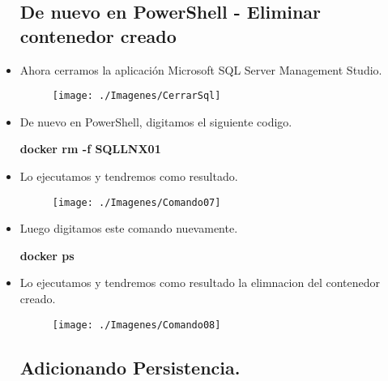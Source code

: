 \begin{itemize}
			\subsection{De nuevo en PowerShell - Eliminar contenedor creado}
				\item Ahora cerramos la aplicación Microsoft SQL Server Management Studio.
					\begin{figure}[htb]
						\begin{center}
							\texttt{[image: ./Imagenes/CerrarSql]}
						\end{center}
					\end{figure}
				\item De nuevo en PowerShell, digitamos el siguiente codigo.
					\begin{center}
						\textbf{docker rm -f SQLLNX01} \\
					\end{center}
				\item Lo ejecutamos y tendremos como resultado.
					\begin{figure}[htb]
						\begin{center}
							\texttt{[image: ./Imagenes/Comando07]}
						\end{center}
					\end{figure}
				\item Luego digitamos este comando nuevamente.
					\begin{center}
						\textbf{docker ps} \\
					\end{center}
				\item Lo ejecutamos y tendremos como resultado la elimnacion del contenedor creado.
					\begin{figure}[htb]
						\begin{center}
							\texttt{[image: ./Imagenes/Comando08]}
						\end{center}
					\end{figure}
					\vspace{5cm}
			\subsection{Adicionando Persistencia.}

\end{itemize}
